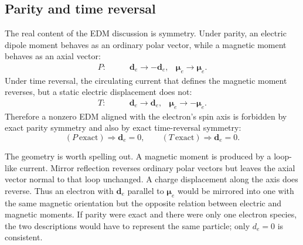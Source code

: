 \begin{classroomqa}
\end{classroomqa}

\begin{classroomqa}
\end{classroomqa}

\subsection{Parity and time reversal}

The real content of the EDM discussion is symmetry. Under parity, an electric dipole moment behaves as an ordinary polar vector, while a magnetic moment behaves as an axial vector:
\begin{align}
P:\qquad &\mathbf d_e \to -\mathbf d_e,
&\boldsymbol{\mu}_e \to \boldsymbol{\mu}_e .
\end{align}
Under time reversal, the circulating current that defines the magnetic moment reverses, but a static electric displacement does not:
\begin{align}
T:\qquad &\mathbf d_e \to \mathbf d_e,
&\boldsymbol{\mu}_e \to -\boldsymbol{\mu}_e .
\end{align}
Therefore a nonzero EDM aligned with the electron's spin axis is forbidden by exact parity symmetry and also by exact time-reversal symmetry:
\begin{equation}
(P\ \text{exact}) \Rightarrow \mathbf d_e=0,
\qquad
(T\ \text{exact}) \Rightarrow \mathbf d_e=0.
\end{equation}

The geometry is worth spelling out. A magnetic moment is produced by a loop-like current. Mirror reflection reverses ordinary polar vectors but leaves the axial vector normal to that loop unchanged. A charge displacement along the axis does reverse. Thus an electron with \(\mathbf d_e\) parallel to \(\boldsymbol\mu_e\) would be mirrored into one with the same magnetic orientation but the opposite relation between electric and magnetic moments. If parity were exact and there were only one electron species, the two descriptions would have to represent the same particle; only \(d_e=0\) is consistent.

